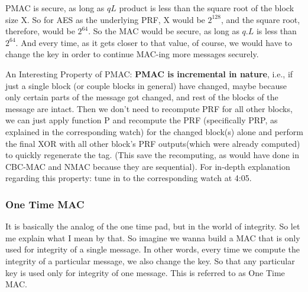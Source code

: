\documentclass[11pt]{article}
\begin{document}
PMAC is secure, as long as \(qL\) product is less than the square root
of the block size \textbar{}X\textbar{}. So for AES as the underlying
PRF, \textbar{}X\textbar{} would be \(2^{128}\), and the square root,
therefore, would be \(2^{64}\). So the MAC would be secure, as long as
\(q.L\) is less than \(2^{64}\). And every time, as it gets closer to
that value, of course, we would have to change the key in order to
continue MAC-ing more messages securely.

An Interesting Property of PMAC: \textbf{PMAC is incremental in nature},
i.e., if just a single block (or couple blocks in general) have changed,
maybe because only certain parts of the message got changed, and rest of
the blocks of the message are intact. Then we don't need to recompute
PRF for all other blocks, we can just apply function P and recompute the
PRF (specifically PRP, as explained in the corresponding watch) for the
changed block(s) alone and perform the final XOR with all other block's
PRF outputs(which were already computed) to quickly regenerate the tag.
(This save the recomputing, as would have done in CBC-MAC and NMAC
because they are sequential). For in-depth explanation regarding this
property: tune in to the corresponding watch at 4:05.

\hypertarget{one-time-mac}{%
\subsubsection{One Time MAC}\label{one-time-mac}}

It is basically the analog of the one time pad, but in the world of
integrity. So let me explain what I mean by that. So imagine we wanna
build a MAC that is only used for integrity of a single message. In
other words, every time we compute the integrity of a particular
message, we also change the key. So that any particular key is used only
for integrity of one message. This is referred to as One Time MAC.
\end{document}
